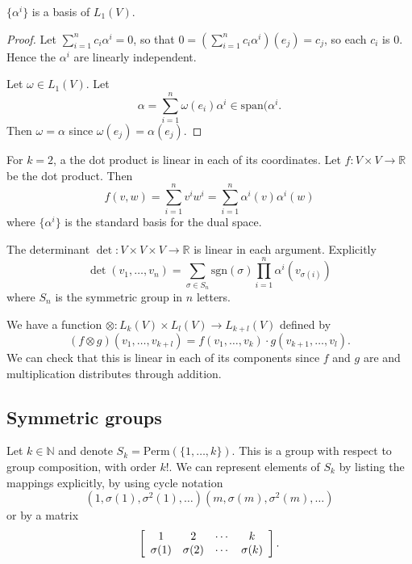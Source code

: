 \begin{lemma}
$\{ \alpha^i \}$ is a basis of $L_1(V)$.
\end{lemma}

\begin{proof}
Let $\sum_{i=1}^n c_i \alpha^i = 0$, so that
$0 = \left(\sum_{i=1}^n c_i \alpha^i\right)(e_j) = c_j$,
so each $c_i$ is 0. Hence the $\alpha^i$ are linearly independent.

Let $\omega \in L_1(V)$. Let
$$
  \alpha
= \sum_{i=1}^n \omega(e_i) \alpha^i
\in \mathrm{span}(\alpha^i.
$$
Then $\omega = \alpha$ since $\omega(e_j) = \alpha(e_j)$.
\end{proof}

\begin{xmpl}
For $k = 2$, a the dot product is linear in each of its coordinates.
Let $f : V \times V \to \mathbb{R}$ be the dot product. Then
$$
  f(v, w)
= \sum_{i=1}^n v^i w^i
= \sum_{i=1}^n \alpha^i(v) \alpha^i(w)
$$
where $\{ \alpha^i \}$ is the standard basis for the dual space.
\end{xmpl}

\begin{xmpl}
The determinant $\det : V \times V \times V \to \mathbb{R}$ is linear
in each argument. Explicitly
$$
  \det (v_1, \dots, v_n)
= \sum_{\sigma \in S_n}
    \mathrm{sgn}(\sigma)
    \prod_{i=1}^n
      \alpha^i(v_{\sigma(i)})
$$
where $S_n$ is the symmetric group in $n$ letters.
\end{xmpl}

\begin{defn}
We have a function
$\otimes : L_k (V) \times L_l(V) \to L_{k + l}(V)$ defined by
$$
  (f \otimes g)
    (v_1, \dots, v_{k+l})
= f(v_1, \dots, v_k) \cdot g(v_{k+1}, \dots, v_l).
$$
We can check that this is linear in each of its components since $f$
and $g$ are and multiplication distributes through addition.
\end{defn}

\subsection{Symmetric groups}
Let $k \in \mathbb{N}$ and denote
$S_k = \mathrm{Perm}(\{1, \dots, k\})$. This is a group with respect
to group composition, with order $k!$. We can represent elements of
$S_k$ by listing the mappings explicitly, by using cycle notation
$$
(1, \sigma(1), \sigma^2(1), \dots)(m, \sigma(m), \sigma^2(m), \dots)
$$
or by a matrix
$$
\left[
  \begin{array}{c c c c}
    1         & 2         & \cdots & k \\
    \sigma(1) & \sigma(2) & \cdots & \sigma(k)
  \end{array}
\right].
$$

